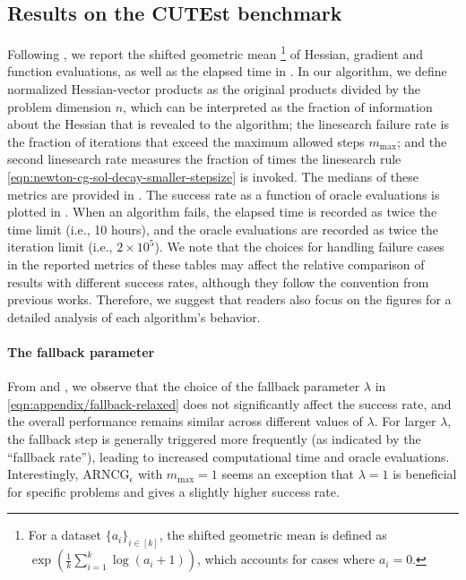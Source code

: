 \subsection{Results on the CUTEst benchmark}



Following \citet{hamad2024simple}, we report the shifted geometric mean%
\footnote{For a dataset $\{ a_i \}_{i\in[k]}$, the shifted geometric mean is defined as  $\exp\left( \frac{1}{k} \sum_{i=1}^k \log (a_i + 1)  \right)$, which accounts for cases where $a_i = 0$.} 
of Hessian, gradient and function evaluations, as well as the elapsed time in .
In our algorithm, we define normalized Hessian-vector products as the original products divided by the problem dimension $n$,
which can be interpreted as the fraction of information about the Hessian that is revealed to the algorithm;
the linesearch failure rate is the fraction of iterations that exceed the maximum allowed steps $m_{\mathrm{max}}$; 
and the second linesearch rate measures the fraction of times the linesearch rule \eqref{eqn:newton-cg-sol-decay-smaller-stepsize} is invoked.
The medians of these metrics are provided in .
The success rate as a function of oracle evaluations is plotted in .
When an algorithm fails, the elapsed time is recorded as twice the time limit (i.e., 10 hours), and the oracle evaluations are recorded as twice the iteration limit (i.e., $2 \times 10^5$).
We note that the choices for handling failure cases in the reported metrics of these tables may affect the relative comparison of results with different success rates,
although they follow the convention from previous works.
Therefore, we suggest that readers also focus on the figures for a detailed analysis of each algorithm's behavior.


\paragraph{The fallback parameter}
From  and , 
we observe that the choice of the fallback parameter $\lambda$ in \eqref{eqn:appendix/fallback-relaxed} 
does not significantly affect the success rate, 
and the overall performance remains similar across different values of $\lambda$.  
For larger $\lambda$, the fallback step is generally triggered more frequently (as indicated by the ``fallback rate''), leading to increased computational time and oracle evaluations.
Interestingly, ARNCG$_\epsilon$ with $m_{\mathrm{max}} = 1$ seems an exception that $\lambda = 1$ is beneficial for specific problems and gives a slightly higher success rate.

